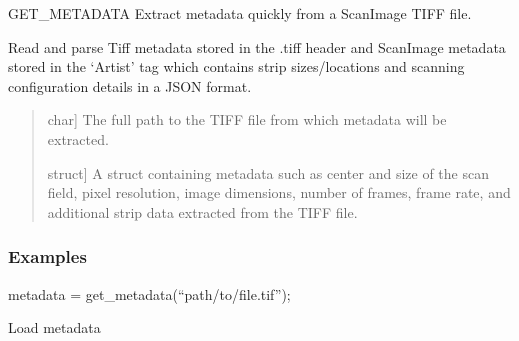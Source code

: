 \documentclass[letterpaper,10pt,english]{sphinxmanual}
\begin{document}
\begin{fulllineitems}
\label{\detokenize{api/utils:get_metadata}}
\pysigstartsignatures
{}
\pysigstopsignatures
\sphinxAtStartPar
GET\_METADATA Extract metadata quickly from a ScanImage TIFF file.

\sphinxAtStartPar
Read and parse Tiff metadata stored in the .tiff header
and ScanImage metadata stored in the ‘Artist’ tag which contains strip sizes/locations and scanning configuration
details in a JSON format.
\begin{quote}\begin{description}
\begin{description}
\sphinxlineitem{\sphinxstylestrong{filename}}{[}char{]}
\sphinxAtStartPar
The full path to the TIFF file from which metadata will be extracted.

\end{description}

\begin{description}
\sphinxlineitem{\sphinxstylestrong{metadata\_out}}{[}struct{]}
\sphinxAtStartPar
A struct containing metadata such as center and size of the scan field,
pixel resolution, image dimensions, number of frames, frame rate, and
additional strip data extracted from the TIFF file.

\end{description}

\end{description}\end{quote}
\subsubsection*{Examples}

\sphinxAtStartPar
metadata = get\_metadata(“path/to/file.tif”);

\end{fulllineitems}


\begin{fulllineitems}
\label{\detokenize{api/utils:combinePlanes}}
\pysigstartsignatures
{}
\pysigstopsignatures
\sphinxAtStartPar
Load metadata

\end{fulllineitems}
\end{document}
